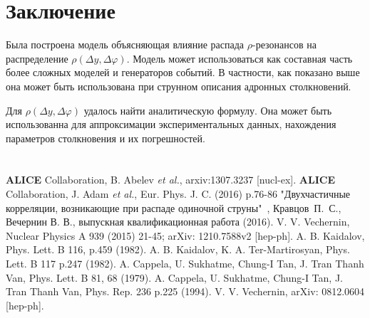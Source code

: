 \documentclass[12pt]{article}
\renewcommand{\phi}{\varphi}
\def\Dphi{\Delta\phi}
\def\Dy{\Delta y}
\begin{document}
\section{Заключение}
\qquad Была построена модель объясняющая влияние распада $\rho$-резонансов на распределение $\rho (\Dy, \Dphi)$. Модель может использоваться как составная часть более сложных моделей и генераторов событий. В частности, как показано выше она может быть использована при струнном описания адронных столкновений.

Для  $\rho (\Dy, \Dphi)$ удалось найти аналитическую формулу. Она может быть использованна для аппроксимации экспериментальных данных, нахождения параметров столкновения и их погрешностей.

\newpage
\section*{}
\begin{thebibliography}{00}
{\bf ALICE} Collaboration, B. Abelev \textit{et al.}, arxiv:1307.3237 [nucl-ex].
{\bf ALICE} Collaboration, J. Adam \textit{et al.}, Eur. Phys. J. C. (2016) p.76-86
"Двухчастичные корреляции, возникающие при распаде одиночной струны"\ , Кравцов\ П.\ С., Вечернин В. В., выпускная квалификационная работа (2016).
V. V. Vechernin, Nuclear Physics A 939 (2015) 21-45; arXiv: 1210.7588v2 [hep-ph].
A. B. Kaidalov, Phys. Lett. B 116, p.459 (1982).
A. B. Kaidalov, K. A. Ter-Martirosyan, Phys. Lett. B 117 p.247 (1982).
A. Cappela, U. Sukhatme, Chung-I Tan, J. Tran Thanh Van, Phys. Lett. B 81, 68 (1979).
A. Cappela, U. Sukhatme, Chung-I Tan, J. Tran Thanh Van, Phys. Rep. 236 p.225 (1994).
V. V. Vechernin, arXiv: 0812.0604 [hep-ph].
\end{thebibliography}
\end{document}

